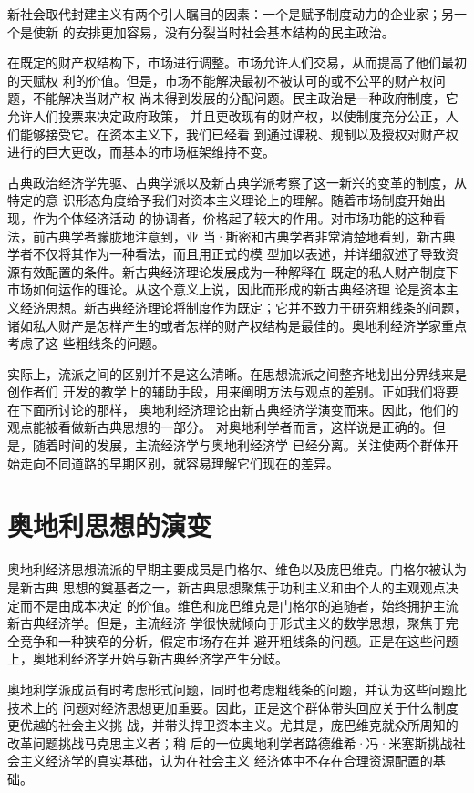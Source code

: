 新社会取代封建主义有两个引人瞩目的因素：一个是赋予制度动力的企业家；另一个是使新
的安排更加容易，没有分裂当时社会基本结构的民主政治。

在既定的财产权结构下，市场进行调整。市场允许人们交易，从而提高了他们最初的天赋权
利的价值。但是，市场不能解决最初不被认可的或不公平的财产权问题，不能解决当财产权
尚未得到发展的分配问题。民主政治是一种政府制度，它允许人们投票来决定政府政策，
并且更改现有的财产权，以使制度充分公正，人们能够接受它。在资本主义下，我们已经看
到通过课税、规制以及授权对财产权进行的巨大更改，而基本的市场框架维持不变。

古典政治经济学先驱、古典学派以及新古典学派考察了这一新兴的变革的制度，从特定的意
识形态角度给予我们对资本主义理论上的理解。随着市场制度开始出现，作为个体经济活动
的协调者，价格起了较大的作用。对市场功能的这种看法，前古典学者朦胧地注意到，亚
当·斯密和古典学者非常清楚地看到，新古典学者不仅将其作为一种看法，而且用正式的模
型加以表述，并详细叙述了导致资源有效配置的条件。新古典经济理论发展成为一种解释在
既定的私人财产制度下市场如何运作的理论。从这个意义上说，因此而形成的新古典经济理
论是资本主义经济思想。新古典经济理论将制度作为既定；它并不致力于研究粗线条的问题，
诸如私人财产是怎样产生的或者怎样的财产权结构是最佳的。奥地利经济学家重点考虑了这
些粗线条的问题。

实际上，流派之间的区别并不是这么清晰。在思想流派之间整齐地划出分界线来是创作者们
开发的教学上的辅助手段，用来阐明方法与观点的差别。正如我们将要在下面所讨论的那样，
奥地利经济理论由新古典经济学演变而来。因此，他们的观点能被看做新古典思想的一部分。
对奥地利学者而言，这样说是正确的。但是，随着时间的发展，主流经济学与奥地利经济学
已经分离。关注使两个群体开始走向不同道路的早期区别，就容易理解它们现在的差异。

\section{奥地利思想的演变}

奥地利经济思想流派的早期主要成员是门格尔、维色以及庞巴维克。门格尔被认为是新古典
思想的奠基者之一，新古典思想聚焦于功利主义和由个人的主观观点决定而不是由成本决定
的价值。维色和庞巴维克是门格尔的追随者，始终拥护主流新古典经济学。但是，主流经济
学很快就倾向于形式主义的数学思想，聚焦于完全竞争和一种狭窄的分析，假定市场存在并
避开粗线条的问题。正是在这些问题上，奥地利经济学开始与新古典经济学产生分歧。

奥地利学派成员有时考虑形式问题，同时也考虑粗线条的问题，并认为这些问题比技术上的
问题对经济思想更加重要。因此，正是这个群体带头回应关于什么制度更优越的社会主义挑
战，并带头捍卫资本主义。尤其是，庞巴维克就众所周知的改革问题挑战马克思主义者；稍
后的一位奥地利学者路德维希·冯·米塞斯挑战社会主义经济学的真实基础，认为在社会主义
经济体中不存在合理资源配置的基础。

